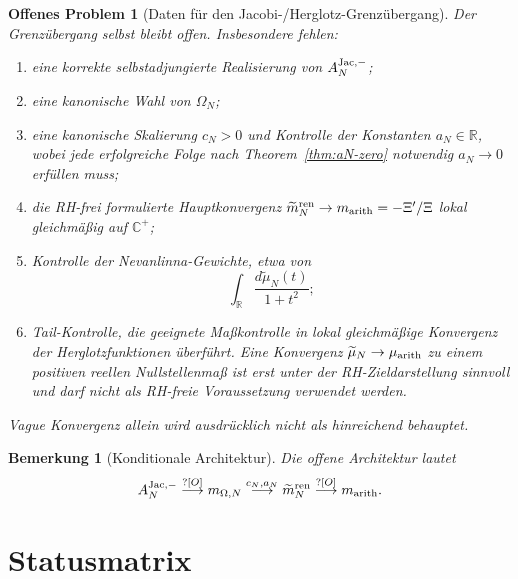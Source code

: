 \documentclass[11pt,a4paper]{amsart}
\newtheorem{remark}[theorem]{Bemerkung}
\newtheorem{openproblem}[theorem]{Offenes Problem}
\begin{document}
\begin{openproblem}[Daten für den Jacobi-/Herglotz-Grenzübergang]
\label{op:jacobi-limit}
Der Grenzübergang selbst bleibt offen. Insbesondere fehlen:
\begin{enumerate}
  \item eine korrekte selbstadjungierte Realisierung von
        $A_N^{\rm Jac,-}$;
  \item eine kanonische Wahl von $\Omega_N$;
  \item eine kanonische Skalierung $c_N>0$ und Kontrolle der Konstanten
        $a_N\in\mathbb R$, wobei jede erfolgreiche Folge nach
        Theorem~\ref{thm:aN-zero} notwendig $a_N\to0$ erfüllen muss;
  \item die RH-frei formulierte Hauptkonvergenz
        $\widetilde m_N^{\rm ren}\to m_{\rm arith}=-\Xi'/\Xi$
        lokal gleichmäßig auf $\mathbb C^+$;
  \item Kontrolle der Nevanlinna-Gewichte, etwa von
        \[
          \int_{\mathbb R}
          \frac{d\widetilde\mu_N(t)}{1+t^2};
        \]
  \item Tail-Kontrolle, die geeignete Maßkontrolle in lokal gleichmäßige
        Konvergenz der Herglotzfunktionen überführt. Eine Konvergenz
        $\widetilde\mu_N\to\mu_{\rm arith}$ zu einem positiven reellen
        Nullstellenmaß ist erst unter der RH-Zieldarstellung sinnvoll und darf
        nicht als RH-freie Voraussetzung verwendet werden.
\end{enumerate}
Vague Konvergenz allein wird ausdrücklich nicht als hinreichend behauptet.
\end{openproblem}

\begin{remark}[Konditionale Architektur]\label{rem:conditional-chain}
Die offene Architektur lautet
\[
  A_N^{\rm Jac,-}
  \stackrel{?[O]}{\longrightarrow}
  m_{\Omega,N}
  \stackrel{c_N,a_N}{\longrightarrow}
  \widetilde m_N^{\rm ren}
  \stackrel{?[O]}{\longrightarrow}
  m_{\rm arith}.
\]
\end{remark}

\section{Statusmatrix}
\end{document}
